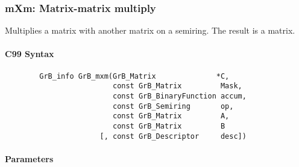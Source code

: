 \subsubsection{{\sf mXm}: Matrix-matrix multiply}

Multiplies a matrix with another matrix on a semiring. The result is a matrix.

\paragraph{C99 Syntax}

\begin{verbatim}
        GrB_info GrB_mxm(GrB_Matrix              *C,
                         const GrB_Matrix         Mask,
                         const GrB_BinaryFunction accum,
                         const GrB_Semiring       op,
                         const GrB_Matrix         A, 
                         const GrB_Matrix         B
                      [, const GrB_Descriptor     desc])
\end{verbatim}

\paragraph{Parameters}

